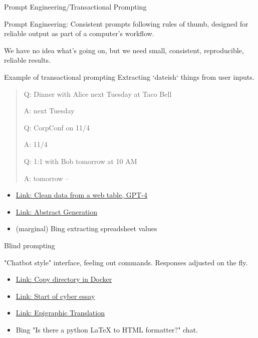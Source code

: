 \documentclass[aspectratio=169]{beamer}
\begin{document}
\begin{frame}{Prompt Engineering/Transactional Prompting}

Prompt Engineering: Consistent prompts following rules of thumb, designed for reliable output as part of a computer's workflow.

We have no idea what's going on, but we need small, consistent, reproducible, reliable results.
    
\end{frame}
\begin{frame}{Example of transactional prompting}
Extracting `dateish` things from user inputs.

    \begin{quote}
        Q: Dinner with Alice next Tuesday at Taco Bell
        
A: next Tuesday

Q: CorpConf on 11/4

A: 11/4

Q: 1:1 with Bob tomorrow at 10 AM

A: tomorrow --\parencite{Hashimoto2023-qo}
    \end{quote}

\begin{itemize}
    \item \href{https://chat.openai.com/share/7d52a80f-ae8b-4b02-9048-fd3a91416778}{Link: Clean data from a web table, GPT-4}
    \item \href{https://chat.openai.com/share/0bda34c2-a4eb-416c-a260-0fbfe340aba0}{Link: Abstract Generation}
    \item (marginal) Bing extracting spreadsheet values
\end{itemize}
    
\end{frame}
\begin{frame}{Blind prompting}

"Chatbot style" interface, feeling out commands. Responses adjusted on the fly.

\begin{itemize}
    \item \href{https://chat.openai.com/share/a879253c-cad7-4996-aea0-f2ef1a3c87ad}{Link: Copy directory in Docker}
    \item \href{https://chat.openai.com/share/10f9a2fe-e642-49a5-9474-f4d2fcb989fe}{Link: Start of cyber essay}
    \item \href{https://chat.openai.com/share/e49c3fdf-65b3-475c-97d4-bc69354cd5f0}{Link: Epigraphic Translation}
    \item Bing "Is there a python LaTeX to HTML formatter?" chat.
\end{itemize}
    
\end{frame}
\end{document}
